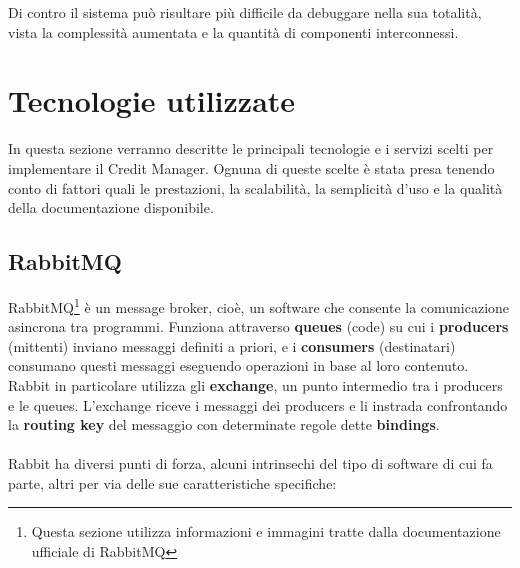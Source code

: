 Di contro il sistema pu\`o risultare pi\`u difficile da debuggare nella sua totalit\`a, vista la complessit\`a aumentata e la quantit\`a di componenti interconnessi.

\section{Tecnologie utilizzate}
In questa sezione verranno descritte le principali tecnologie e i servizi scelti per implementare il Credit Manager.
Ognuna di queste scelte \`e stata presa tenendo conto di fattori quali le prestazioni, la scalabilit\`a, la semplicit\`a d'uso e la qualit\`a della documentazione disponibile.

\subsection{RabbitMQ}
RabbitMQ\footnote{Questa sezione utilizza informazioni e immagini tratte dalla documentazione ufficiale di RabbitMQ\cite{rabbitmq}}
\`e un message broker, cio\`e, un software che consente la comunicazione asincrona tra programmi.
Funziona attraverso \textbf{queues} (code) su cui i \textbf{producers} (mittenti) inviano messaggi definiti a priori,
e i \textbf{consumers} (destinatari) consumano questi messaggi eseguendo operazioni in base al loro contenuto.
Rabbit in particolare utilizza gli \textbf{exchange}, un punto intermedio tra i producers e le queues.
L'exchange riceve i messaggi dei producers e li instrada confrontando la \textbf{routing key} del messaggio con determinate regole dette \textbf{bindings}.
\\\\
Rabbit ha diversi punti di forza, alcuni intrinsechi del tipo di software di cui fa parte, altri per via delle sue caratteristiche specifiche:\
